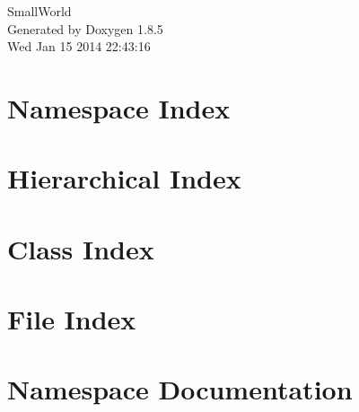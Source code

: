\documentclass[twoside]{book}
\newcommand{\clearemptydoublepage}{%
  \newpage{\pagestyle{empty}\cleardoublepage}%
}
\begin{document}
\hypersetup{pageanchor=false}
\begin{titlepage}
\vspace*{7cm}
\begin{center}%
{\Large Small\-World }\\
\vspace*{1cm}
{\large Generated by Doxygen 1.8.5}\\
\vspace*{0.5cm}
{\small Wed Jan 15 2014 22:43:16}\\
\end{center}
\end{titlepage}
\clearemptydoublepage
\tableofcontents
\clearemptydoublepage
{}
\hypersetup{pageanchor=true}

\chapter{Namespace Index}

\chapter{Hierarchical Index}

\chapter{Class Index}

\chapter{File Index}

\chapter{Namespace Documentation}


\end{document}
